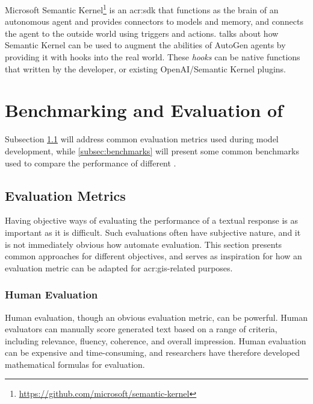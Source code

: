 Microsoft Semantic Kernel\footnote{\url{https://github.com/microsoft/semantic-kernel}} is an \acrshort{acr:sdk} that functions as the brain of an autonomous agent and provides connectors to models and memory, and connects the agent to the outside world using triggers and actions. \cite{maedaAutoGenAgentsMeet2023} talks about how Semantic Kernel can be used to augment the abilities of AutoGen agents by providing it with hooks into the real world. These \textit{hooks} can be native functions that written by the developer, or existing OpenAI/Semantic Kernel plugins.



\section[Benchmarking and Evaluation of LLMs]{Benchmarking and Evaluation of }\label{sec:benchmarking-and-evaluation}

Subsection \ref{subsec:evaluation-metrics} will address common evaluation metrics used during model development, while \autoref{subsec:benchmarks} will present some common benchmarks used to compare the performance of different .

\subsection{Evaluation Metrics}\label{subsec:evaluation-metrics}

Having objective ways of evaluating the performance of a textual response is as important as it is difficult. Such evaluations often have subjective nature, and it is not immediately obvious how automate evaluation. This section presents common approaches for different objectives, and serves as inspiration for how an evaluation metric can be adapted for \acrshort{acr:gis}-related purposes.

\subsubsection{Human Evaluation}

Human evaluation, though an obvious evaluation metric, can be powerful. Human evaluators can manually score generated text based on a range of criteria, including relevance, fluency, coherence, and overall impression. Human evaluation can be expensive and time-consuming, and researchers have therefore developed mathematical formulas for evaluation.


